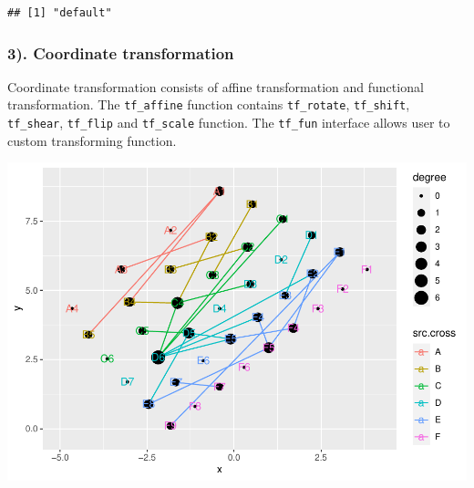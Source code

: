 \documentclass[
]{article}
\newenvironment{Shaded}{\begin{snugshade}}{\end{snugshade}}
\newcommand{\CommentTok}[1]{\textcolor[rgb]{0.56,0.35,0.01}{\textit{#1}}}
\newcommand{\DataTypeTok}[1]{\textcolor[rgb]{0.13,0.29,0.53}{#1}}
\newcommand{\DecValTok}[1]{\textcolor[rgb]{0.00,0.00,0.81}{#1}}
\newcommand{\KeywordTok}[1]{\textcolor[rgb]{0.13,0.29,0.53}{\textbf{#1}}}
\newcommand{\NormalTok}[1]{#1}
\newcommand{\OperatorTok}[1]{\textcolor[rgb]{0.81,0.36,0.00}{\textbf{#1}}}
\newcommand{\StringTok}[1]{\textcolor[rgb]{0.31,0.60,0.02}{#1}}
\begin{document}
\begin{Shaded}
\end{Shaded}

\begin{verbatim}
## [1] "default"
\end{verbatim}

\hypertarget{coordinate-transformation}{%
\subsubsection{3). Coordinate
transformation}\label{coordinate-transformation}}

Coordinate transformation consists of affine transformation and
functional transformation. The \texttt{tf\_affine} function contains
\texttt{tf\_rotate}, \texttt{tf\_shift}, \texttt{tf\_shear},
\texttt{tf\_flip} and \texttt{tf\_scale} function. The \texttt{tf\_fun}
interface allows user to custom transforming function.

\begin{Shaded}
\end{Shaded}

\includegraphics{ReadMe_files/figure-latex/unnamed-chunk-6-1.pdf}
\end{document}
